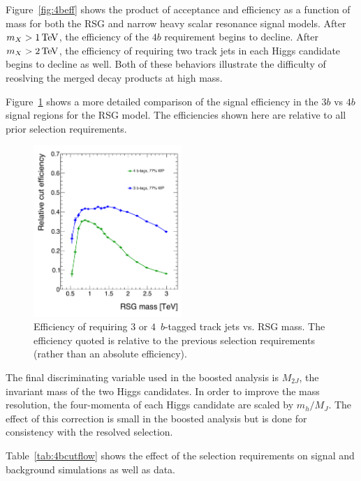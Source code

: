 Figure~\ref{fig:4beff} shows the product of acceptance and efficiency as a function of mass for both the RSG and narrow heavy scalar resonance signal models. After $m_{X} > 1 \TeV$, the efficiency of the $4b$ requirement begins to decline. After $m_{X} > 2 \TeV$, the efficiency of requiring two track jets in each Higgs candidate begins to decline as well. Both of these behaviors illustrate the difficulty of reoslving the merged decay products at high mass.

Figure~\ref{fig:3bvs4b} shows a more detailed comparison of the signal efficiency in the $3b$ vs $4b$ signal regions for the RSG model. The efficiencies shown here are relative to all prior selection requirements. 

\begin{figure}[h!]
  \centering
  \captionsetup{justification=centering}

  \includegraphics[width=0.5\textwidth]{figures/3bvs4b_eff}
  \caption{Efficiency of requiring $3$ or $4\,$ $b$-tagged track jets vs. RSG mass. The efficiency quoted is relative to the previous selection requirements (rather than an absolute efficiency). }
  \label{fig:3bvs4b}
\end{figure}

The final discriminating variable used in the boosted analysis is $M_{2J}$, the invariant mass of the two Higgs candidates. In order to improve the mass resolution, the four-momenta of each Higgs candidate are scaled by $m_{h}/M_{J}$. The effect of this correction is small in the boosted analysis but is done for consistency with the resolved selection. 

Table~\ref{tab:4bcutflow} shows the effect of the selection requirements on signal and background simulations as well as data. 

